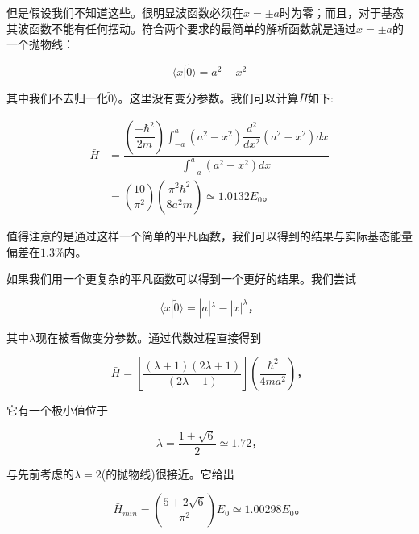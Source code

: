 ﻿\documentclass[UTF8,twoside]{ctexart}
\begin{document}
\noindent 但是假设我们不知道这些。很明显波函数必须在$x=\pm a$时为零；而且，对于基态其波函数不能有任何摆动。符合两个要求的最简单的解析函数就是通过$x=\pm a$的一个抛物线：

\begin{equation} \label{5.4.13}
\langle x|\tilde{0}\rangle=a^2-x^2
\end{equation}

\noindent 其中我们不去归一化$\tilde{0}\rangle$。这里没有变分参数。我们可以计算$\bar{H}$如下:

\begin{equation} \label{5.4.14}
\begin{split}
\bar{H}&=\dfrac{\left(\dfrac{-\hbar^2}{2m}\right)\displaystyle\int_{-a}^a(a^2-x^2)\dfrac{d^2}{dx^2}(a^2-x^2)dx} {\displaystyle\int_{-a}^a(a^2-x^2)dx}\\
&=\left(\dfrac{10}{\pi^2}\right)\left(\dfrac{\pi^2\hbar^2}{8a^2m}\right)\simeq1.0132E_0\text{。}
\end{split}
\end{equation}

\noindent 值得注意的是通过这样一个简单的平凡函数，我们可以得到的结果与实际基态能量偏差在$1.3\%$内。

如果我们用一个更复杂的平凡函数可以得到一个更好的结果。我们尝试

\begin{equation} \label{5.4.15}
\langle x|\tilde{0}\rangle=|a|^{\lambda}-|x|^{\lambda}\text{，}
\end{equation}

\noindent 其中$\lambda$现在被看做变分参数。通过代数过程直接得到

\begin{equation} \label{5.4.16}
\bar{H}=\left[\dfrac{(\lambda+1)(2\lambda+1)}{(2\lambda-1)}\right]\left(\dfrac{\hbar^2}{4ma^2}\right)\text{，}
\end{equation}

\noindent 它有一个极小值位于

\begin{equation} \label{5.4.1.7}
\lambda=\dfrac{1+\sqrt{6}}{2}\simeq1.72\text{，}
\end{equation}

\noindent 与先前考虑的$\lambda=2$(的抛物线)很接近。它给出

\begin{equation} \label{5.4.18}
\bar{H}_{min}=\left(\dfrac{5+2\sqrt{6}}{\pi^2}\right)E_0\simeq 1.00298E_0\text{。}
\end{equation}
\end{document}
